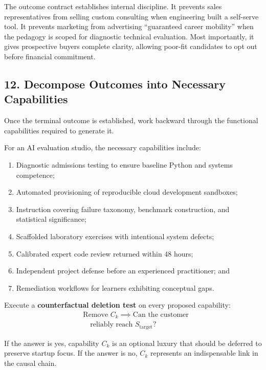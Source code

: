 The outcome contract establishes internal discipline. It prevents sales representatives from selling custom consulting when engineering built a self-serve tool. It prevents marketing from advertising ``guaranteed career mobility'' when the pedagogy is scoped for diagnostic technical evaluation. Most importantly, it gives prospective buyers complete clarity, allowing poor-fit candidates to opt out before financial commitment.

\subsection*{12. Decompose Outcomes into Necessary Capabilities}

Once the terminal outcome is established, work backward through the functional capabilities required to generate it.

For an AI evaluation studio, the necessary capabilities include:
\begin{enumerate}
    \item Diagnostic admissions testing to ensure baseline Python and systems competence;
    \item Automated provisioning of reproducible cloud development sandboxes;
    \item Instruction covering failure taxonomy, benchmark construction, and statistical significance;
    \item Scaffolded laboratory exercises with intentional system defects;
    \item Calibrated expert code review returned within 48 hours;
    \item Independent project defense before an experienced practitioner; and
    \item Remediation workflows for learners exhibiting conceptual gaps.
\end{enumerate}

Execute a \textbf{counterfactual deletion test} on every proposed capability:
\begin{equation}
\begin{aligned}
&\text{Remove } C_k \implies \text{Can the customer} \\
&\quad\text{reliably reach } S_{\text{target}}\text{?}
\end{aligned}
\end{equation}

If the answer is yes, capability $C_k$ is an optional luxury that should be deferred to preserve startup focus. If the answer is no, $C_k$ represents an indispensable link in the causal chain.

